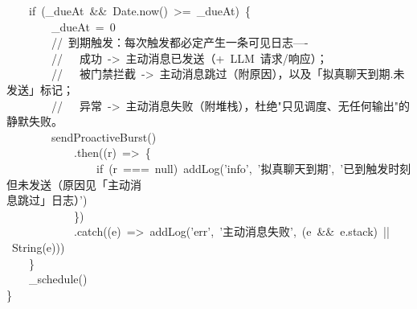 \documentclass[a4paper,10pt]{article}
\begin{document}
{~~~~if~(\_dueAt~\&\&~Date.now()~>=~\_dueAt)~\{\\
~~~~~~~~\_dueAt~=~0\\
~~~~~~~~//~到期触发：每次触发都必定产生一条可见日志----\\
~~~~~~~~//~~~成功~->~主动消息已发送（+~LLM~请求/响应）；\\
~~~~~~~~//~~~被门禁拦截~->~主动消息跳过（附原因），以及「拟真聊天到期.未发送」标记；\\
~~~~~~~~//~~~异常~->~主动消息失败（附堆栈），杜绝"只见调度、无任何输出"的静默失败。\\
~~~~~~~~sendProactiveBurst()\\
~~~~~~~~~~~~.then((r)~=>~\{\\
~~~~~~~~~~~~~~~~if~(r~===~null)~addLog('info',~'拟真聊天到期',~'已到触发时刻但未发送（原因见「主动消\\
息跳过」日志）')\\
~~~~~~~~~~~~\})\\
~~~~~~~~~~~~.catch((e)~=>~addLog('err',~'主动消息失败',~(e~\&\&~e.stack)~||~String(e)))\\
~~~~\}\\
~~~~\_schedule()\\
\}
}

\newpage
\end{document}
